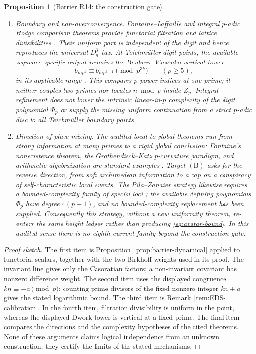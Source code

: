 \documentclass[11pt]{amsart}
\theoremstyle{plain}
\newtheorem{proposition}{Proposition}
\theoremstyle{remark}
\begin{document}
\begin{proposition}[Barrier R14: the construction gate]
\begin{enumerate}
\item \emph{Boundary and non-overconvergence.}  Fontaine--Laffaille and
integral $p$-adic Hodge comparison theorems provide functorial
filtration and lattice divisibilities
\cite{FontaineLaffaille1982,BhattMorrowScholze2018}.  Their uniform
part is independent of the digit and hence reproduces the universal
$D_n^3$ tax.  At Teichm\"uller digit points, the available
sequence-specific output remains the Beukers--Vlasenko vertical tower
\[
 b_{mp^k}\equiv b_{mp^{k-1}}\pmod {p^{3k}}
 \qquad(p\geq5),
\]
in its applicable range \cite{Coster1988,BeukersVlasenko2021}.  This compares
$p$-power indices at one prime; it neither couples two primes nor
locates $n\bmod p$ inside $Z_p$.  Integral refinement does not lower
the intrinsic linear-in-$p$ complexity of the digit polynomial
$\Phi_p$ or supply the missing uniform continuation from a strict
$p$-adic disc to all Teichm\"uller boundary points.

\item \emph{Direction of place mixing.}  The audited local-to-global
theorems run from strong information at many primes to a rigid global
conclusion: Fontaine's nonexistence theorem, the
Grothendieck--Katz $p$-curvature paradigm, and arithmetic
algebraization are standard examples
\cite{Fontaine1985,Katz1972,Andre1989,Bost2001,Chudnovsky1985}.
Target $(\mathrm B)$ asks for the reverse direction, from soft
archimedean information to a cap on a conspiracy of self-characteristic
local events.  The Pila--Zannier strategy likewise requires a
bounded-complexity family of special loci
\cite{PilaZannier2008}; the available defining polynomials
$\Phi_p$ have degree $4(p-1)$, and no bounded-complexity replacement
has been supplied.  Consequently this strategy, without a new
uniformity theorem, re-enters the same height ledger rather than producing
\eqref{eq:avatar-bound}.  In this audited sense there is no eighth
current family beyond the construction gate.
\end{enumerate}
\end{proposition}

\begin{proof}[Proof sketch]
The first item is Proposition~\ref{prop:barrier-dynamical} applied to
functorial scalars, together with the two Birkhoff weights used in its
proof.  The invariant line gives only the Casoratian factors; a
non-invariant covariant has nonzero difference weight.  The second
item uses the displayed congruence $kn\equiv-a\pmod p$; counting prime
divisors of the fixed nonzero integer $kn+a$ gives the stated
logarithmic bound.  The third item is
Remark~\ref{rem:EDS-calibration}.  In the fourth item, filtration
divisibility is uniform in the point, whereas the displayed Dwork
tower is vertical at a fixed prime.  The final item compares the
directions and the complexity hypotheses of the cited theorems.  None
of these arguments claims logical independence from an unknown
construction; they certify the limits of the stated mechanisms.
\end{proof}
\end{document}
